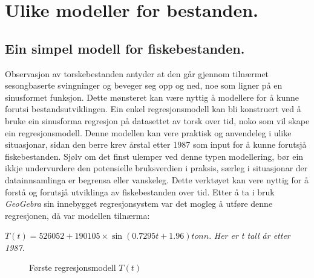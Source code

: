 \documentclass{report}
\begin{document}
\section{Ulike modeller for bestanden.}
\subsection{Ein simpel modell for fiskebestanden.}
Observasjon av torskebestanden antyder at den går gjennom tilnærmet sesongbaserte svingninger og beveger seg opp og ned, noe som ligner på en sinusformet funksjon. Dette mønsteret kan være nyttig å modellere for å kunne forutsi bestandsutviklingen.
Ein enkel regresjonsmodell kan bli konstruert ved å bruke ein sinusforma regresjon på datasettet av torsk over tid, noko som vil skape ein regresjonsmodell. Denne modellen kan vere praktisk og anvendeleg i ulike situasjonar, sidan den berre krev årstal etter 1987 som input for å kunne forutsjå fiskebestanden.
Sjølv om det finst ulemper ved denne typen modellering, bør ein ikkje undervurdere den potensielle bruksverdien i praksis, særleg i situasjonar der datainnsamlinga er begrensa eller vanskeleg. Dette verktøyet kan vere nyttig for å forstå og forutsjå utviklinga av fiskebestanden over tid.
\newline
Etter å ta i bruk \textit{GeoGebra} sin innebygget regresjonsystem var det mogleg å utføre denne regresjonen, då var modellen tilnærma:
\begin{center}
	$T(t) = 526052+190105\times \sin(0.7295t+1.96)tonn.$
	\textit{Her er t tall år etter 1987.}
\end{center}
\begin{figure}[H]
	\centering
	\caption{Første regresjonsmodell $T(t)$}
	\label{T}
\end{figure}
\end{document}
